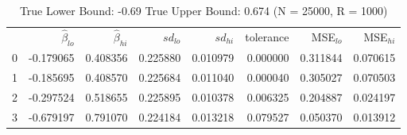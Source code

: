 \begin{table}
\caption{True Lower Bound: -0.69 True Upper Bound: 0.674 (N = 25000, R = 1000)}
\begin{tabular}{lrrrrrrr}
 & $\hat{\beta}_{lo}$ & $\hat{\beta}_{hi}$ & $sd_{lo}$ & $sd_{hi}$ & tolerance & MSE$_{lo}$ & MSE$_{hi}$ \\
0 & -0.179065 & 0.408356 & 0.225880 & 0.010979 & 0.000000 & 0.311844 & 0.070615 \\
1 & -0.185695 & 0.408570 & 0.225684 & 0.011040 & 0.000040 & 0.305027 & 0.070503 \\
2 & -0.297524 & 0.518655 & 0.225895 & 0.010378 & 0.006325 & 0.204887 & 0.024197 \\
3 & -0.679197 & 0.791070 & 0.224184 & 0.013218 & 0.079527 & 0.050370 & 0.013912 \\
\end{tabular}
\end{table}
